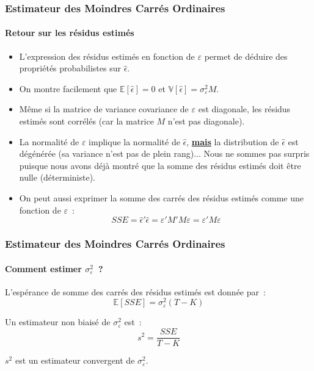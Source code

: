 \documentclass[10pt]{beamer}
\begin{document}
\begin{frame}
  \frametitle{Estimateur des Moindres Carrés Ordinaires}
  \framesubtitle {Retour sur les résidus estimés}

  \begin{itemize}

  \item L'expression des résidus estimés en fonction de $\varepsilon$ permet de déduire des propriétés probabilistes sur $\hat\epsilon$.\newline

  \item On montre facilement que $\mathbb E[\hat\epsilon] = 0$ et $\mathbb V[\hat\epsilon] = \sigma_{\varepsilon}^2M$.\newline

  \item Même si la matrice de variance covariance de $\varepsilon$ est diagonale, les résidus estimés sont corrélés (car la matrice $M$ n'est pas diagonale).\newline

  \item La normalité de $\varepsilon$ implique la normalité de $\hat\epsilon$, \underline{\textbf{mais}} la distribution de $\hat\epsilon$ est dégénérée (sa variance n'est pas de plein rang)... Nous ne sommes pas surpris puisque nous avons déjà montré que la somme des résidus estimés doit être nulle (déterministe).\newline

  \item On peut aussi exprimer la somme des carrés des résidus estimés comme une fonction de $\varepsilon$~:
    \[
      SSE = \hat\epsilon'\hat\epsilon = \varepsilon'M'M \varepsilon = \varepsilon' M \varepsilon
    \]

  \end{itemize}

\end{frame}


\begin{frame}
  \frametitle{Estimateur des Moindres Carrés Ordinaires}
  \framesubtitle {Comment estimer $\sigma_{\varepsilon}^2$~?}

  \begin{prop}\label{prop:sse:expectation}
    L'espérance de somme des carrés des résidus estimés est donnée par~:
    \[
      \mathbb E [SSE] = \sigma_{\varepsilon}^2(T-K)
    \]
  \end{prop}


  \begin{cor}\label{cor:s2}
    Un estimateur non biaisé de $\sigma_{\varepsilon}^2$ est~:
    \[
      s^2 = \frac{SSE}{T-K}
    \]
  \end{cor}


  \begin{prop}\label{prop:s2}
    $s^2$ est un estimateur convergent de $\sigma_{\varepsilon}^2$.
  \end{prop}

\end{frame}
\end{document}
